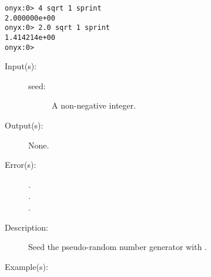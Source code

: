 \begin{description}
\begin{description}
\begin{verbatim}
onyx:0> 4 sqrt 1 sprint
2.000000e+00
onyx:0> 2.0 sqrt 1 sprint
1.414214e+00
onyx:0>
		\end{verbatim}
	\end{description}
\label{systemdict:srand}
\item[{\onyxop{seed}{srand}{--}}: ]
	\begin{description}\item[]
	\item[Input(s): ]
		\begin{description}\item[]
		\item[seed: ]
			A non-negative integer.
		\end{description}
	\item[Output(s): ] None.
	\item[Error(s): ]
		\begin{description}\item[]
		\item[.]
		\item[.]
		\item[.]
		\end{description}
	\item[Description: ]
		Seed the pseudo-random number generator with .
	\item[Example(s): ]\begin{verbatim}


\end{verbatim}
\end{description}
\end{description}
